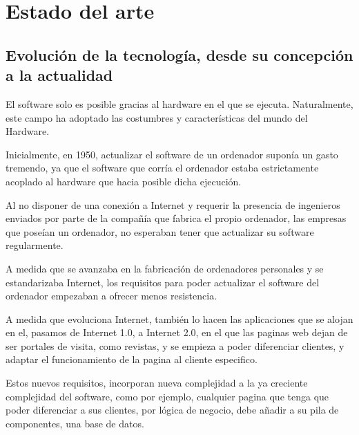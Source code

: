 \documentclass[12pt]{report} %
\begin{document}
	












\clearpage
{} %

\chapter{Estado del arte}

\section{Evolución de la tecnología, desde su concepción a la actualidad}

El software solo es posible gracias al hardware en el que se ejecuta.
Naturalmente, este campo ha adoptado las costumbres y características del mundo del Hardware.

Inicialmente, en 1950, actualizar el software de un ordenador suponía un gasto tremendo, ya que el software que corría el ordenador estaba estrictamente acoplado al hardware que hacia posible dicha ejecución.

Al no disponer de una conexión a Internet y requerir la presencia de ingenieros enviados por parte de la compañía que fabrica el propio ordenador, las empresas que poseían un ordenador, no esperaban tener que actualizar su software regularmente.

A medida que se avanzaba en la fabricación de ordenadores personales y se estandarizaba Internet, los requisitos para poder actualizar el software del ordenador empezaban a ofrecer menos resistencia.

A medida que evoluciona Internet, también lo hacen las aplicaciones que se alojan en el, pasamos de Internet 1.0, a  Internet 2.0, en el que las paginas web dejan de ser portales de visita, como revistas, y se empieza a poder diferenciar clientes, y adaptar el funcionamiento de la pagina al cliente especifico.

Estos nuevos requisitos, incorporan nueva complejidad a la ya creciente complejidad del software, como por ejemplo, cualquier pagina que tenga que poder diferenciar a sus clientes, por lógica de negocio, debe añadir a su pila de componentes, una base de datos.
\end{document}
